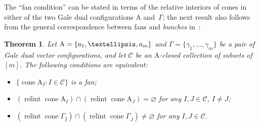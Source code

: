 \documentclass[a4paper]{amsart}
\newtheorem{theorem}{Theorem}[section]
\theoremstyle{definition}
\theoremstyle{remark}
\newtheorem*{remark}{Remark}
\numberwithin{equation}{section}
\newcommand{\mb}[1]{{\textbf {\textit#1}}}
\def\cone{\mathop{\mathrm{cone}}}
\def\relint{\mathop{\mathrm{relint}}}
\newcommand{\<}{\langle}
\renewcommand{\>}{\rangle}
\begin{document}
The ``fan condition'' can be stated in terms of the relative interiors of cones in either of the two Gale dual configurations $\mathrm A$ and~$\Gamma$; the next result also follows from the general correspondence between fans and \emph{bunches} in~\cite[Theorem~2.2.1.14]{a-d-h-l15}:

\begin{theorem}\label{galefangen}
Let $\mathrm A=\{\mb a_1,\ldots,\mb a_m\}$ and $\Gamma=\{\gamma_1,\ldots,\gamma_m\}$ be a pair of Gale dual vector configurations, and let $\mathcal C$ be an $\mathrm A$-closed collection of subsets of~$[m]$. The following conditions are equivalent:

\begin{itemize}
\item[(a)] $\{\cone \mathrm A_I\colon I\in\mathcal C\}$ is a fan;\\[-0.7\baselineskip]

\item[(b)]
$(\relint\cone\mathrm A_I)\cap(\relint\cone\mathrm A_J)=\varnothing$ for any $I,J\in\mathcal C$, $I\ne J$;\\[-0.7\baselineskip]

\item[(c)]
  $(\relint\cone\Gamma_{\widehat I})\cap(\relint\cone\Gamma_{\widehat J})\ne\varnothing$ for any $I,J\in\mathcal C$.
\end{itemize}
\end{theorem}

\end{document}
